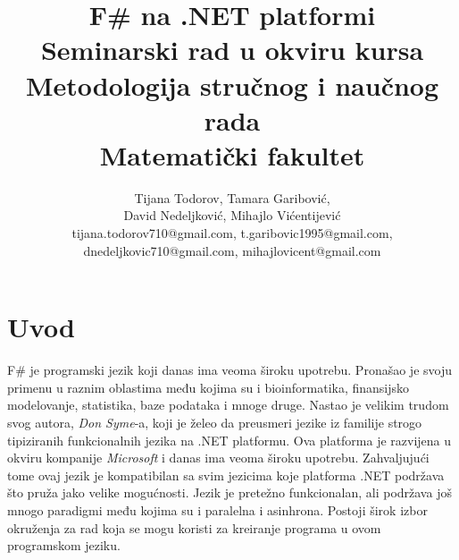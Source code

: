 \documentclass[a4paper]{article}
\begin{document}
\title{F\# na .NET platformi\\ \small{Seminarski rad u okviru kursa\\Metodologija stručnog i naučnog rada\\ Matematički fakultet}}

\author{Tijana Todorov, Tamara Garibović,\\ David Nedeljković, Mihajlo Vićentijević \\ tijana.todorov710@gmail.com, t.garibovic1995@gmail.com, \\ dnedeljkovic710@gmail.com, mihajlovicent@gmail.com}


\maketitle


\tableofcontents
{}
{\setcounter{tocdepth}{1}}

\newpage

\section{Uvod}
\label{sec:uvod}

F\# je programski jezik koji danas ima veoma široku upotrebu. Pronašao je svoju primenu u raznim oblastima među kojima su i bioinformatika, finansijsko modelovanje, statistika, baze podataka i mnoge druge. Nastao je velikim trudom svog autora, {\em Don Syme}-a, koji je želeo da preusmeri jezike iz familije strogo tipiziranih funkcionalnih jezika na .NET platformu. Ova platforma je razvijena u okviru kompanije {\em Microsoft} i danas ima veoma široku upotrebu. Zahvaljujući tome ovaj jezik je kompatibilan sa svim jezicima koje platforma .NET podržava što pruža jako velike mogućnosti. Jezik je pretežno funkcionalan, ali podržava još mnogo paradigmi među kojima su i paralelna i asinhrona. Postoji širok izbor okruženja za rad koja se mogu koristi za kreiranje programa u ovom programskom jeziku. 
\end{document}
